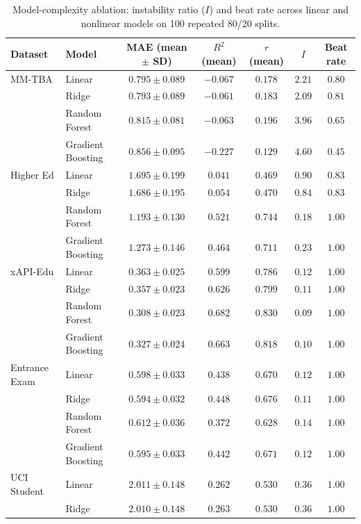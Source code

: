 \documentclass[10pt,letterpaper]{article}
\begin{document}
\begin{table}[!h]
\centering
\caption{Model-complexity ablation: instability ratio ($I$) and beat rate across linear and nonlinear models on 100 repeated 80/20 splits.}
\label{tab:model_complexity}
\small
\begin{tabular}{l l c c c c c}
\toprule
Dataset & Model & MAE (mean $\pm$ SD) & $R^2$ (mean) & $r$ (mean) & $I$ & Beat rate \\
\midrule
MM-TBA & Linear & $0.795 \pm 0.089$ & $-0.067$ & $0.178$ & $2.21$ & $0.80$ \\
 & Ridge & $0.793 \pm 0.089$ & $-0.061$ & $0.183$ & $2.09$ & $0.81$ \\
 & Random Forest & $0.815 \pm 0.081$ & $-0.063$ & $0.196$ & $3.96$ & $0.65$ \\
 & Gradient Boosting & $0.856 \pm 0.095$ & $-0.227$ & $0.129$ & $4.60$ & $0.45$ \\
\midrule
Higher Ed & Linear & $1.695 \pm 0.199$ & $0.041$ & $0.469$ & $0.90$ & $0.83$ \\
 & Ridge & $1.686 \pm 0.195$ & $0.054$ & $0.470$ & $0.84$ & $0.83$ \\
 & Random Forest & $1.193 \pm 0.130$ & $0.521$ & $0.744$ & $0.18$ & $1.00$ \\
 & Gradient Boosting & $1.273 \pm 0.146$ & $0.464$ & $0.711$ & $0.23$ & $1.00$ \\
\midrule
xAPI-Edu & Linear & $0.363 \pm 0.025$ & $0.599$ & $0.786$ & $0.12$ & $1.00$ \\
 & Ridge & $0.357 \pm 0.023$ & $0.626$ & $0.799$ & $0.11$ & $1.00$ \\
 & Random Forest & $0.308 \pm 0.023$ & $0.682$ & $0.830$ & $0.09$ & $1.00$ \\
 & Gradient Boosting & $0.327 \pm 0.024$ & $0.663$ & $0.818$ & $0.10$ & $1.00$ \\
\midrule
Entrance Exam & Linear & $0.598 \pm 0.033$ & $0.438$ & $0.670$ & $0.12$ & $1.00$ \\
 & Ridge & $0.594 \pm 0.032$ & $0.448$ & $0.676$ & $0.11$ & $1.00$ \\
 & Random Forest & $0.612 \pm 0.036$ & $0.372$ & $0.628$ & $0.14$ & $1.00$ \\
 & Gradient Boosting & $0.595 \pm 0.033$ & $0.442$ & $0.671$ & $0.12$ & $1.00$ \\
\midrule
UCI Student & Linear & $2.011 \pm 0.148$ & $0.262$ & $0.530$ & $0.36$ & $1.00$ \\
 & Ridge & $2.010 \pm 0.148$ & $0.263$ & $0.530$ & $0.36$ & $1.00$ \\

\end{tabular}
\end{table}
\end{document}
